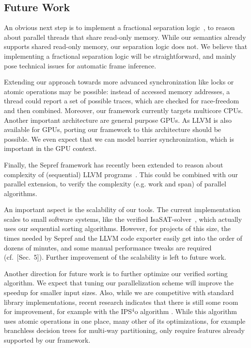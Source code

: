 \documentclass[sn-mathphys,Numbered]{sn-jnl}
\theoremstyle{thmstyleone}%
\theoremstyle{definition}%
\theoremstyle{thmstylethree}%
\begin{document}
%


    \subsection{Future Work}
      An obvious next step is to implement a fractional separation logic~\cite{BCOP05},
      to reason about parallel threads that share read-only memory. While our semantics
      already supports shared read-only memory, our separation logic does not.
      We believe that implementing a fractional separation logic will be straightforward,
      and mainly pose technical issues for automatic frame inference.

      Extending our approach towards more advanced
      synchronization like locks or atomic operations may be possible: instead of accessed memory addresses,
      a thread could report a set of possible traces, which are checked for race-freedom and then combined.
      Moreover, our framework currently targets multicore CPUs. Another important architecture are general purpose GPUs.
      As LLVM is also available for GPUs, porting our framework to this architecture should be possible.
      We even expect that we can model barrier synchronization, which is important in the GPU context.

      Finally, the Sepref framework has recently been extended to reason about complexity of (sequential)
      LLVM programs~\cite{HaLa21-toplas,HaLa21}. This could be combined with our parallel extension, to verify the
      complexity (e.g. work and span) of parallel algorithms.

      An important aspect is the scalability of our tools. The current implementation scales to small software systems, like the verified IsaSAT-solver~\cite{FlLa23}, which actually uses our sequential sorting algorithms. However, for projects of this size, the times needed by Sepref and the LLVM code exporter easily get into the order of dozens of minutes, and some manual performance tweaks are required (cf.~\cite{FlLa23}[Sec.~5]).
      Further improvement of the scalability is left to future work.

      Another direction for future work is to further optimize our verified sorting algorithm.
      We expect that tuning our parallelization scheme will improve the speedup for smaller input sizes.
      Also, while we are competitive with standard library implementations, recent research indicates that there is still
      some room for improvement, for example with the IPS$^4$o algorithm \cite{AWFS22}. While this algorithm uses atomic operations
      in one place, many other of its optimizations, for example branchless decision trees for multi-way partitioning,
      only require features already supported by our framework.
\end{document}
